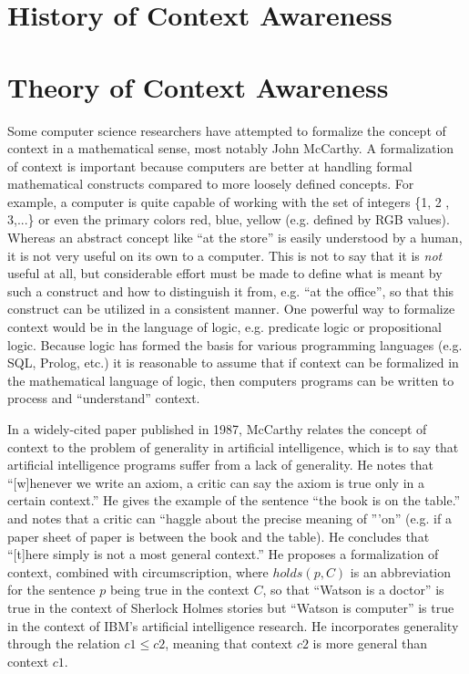 \section{History of Context Awareness}

\section{Theory of Context Awareness}

Some computer science researchers have attempted to formalize the concept of context in a mathematical sense, most notably John McCarthy. A formalization of context is important because computers are better at handling formal mathematical constructs compared to more loosely defined concepts. For example, a computer is quite capable of working with the set of integers \{1, 2 , 3,...\} or even the primary colors {red, blue, yellow} (e.g. defined by RGB values). Whereas an abstract concept like ``at the store'' is easily understood by a human, it is not very useful on its own to a computer. This is not to say that it is \emph{not} useful at all, but considerable effort must be made to define what is meant by such a construct and how to distinguish it from, e.g. ``at the office'', so that this construct can be utilized in a consistent manner. One powerful way to formalize context would be in the language of logic, e.g. predicate logic or propositional logic. Because logic has formed the basis for various programming languages (e.g. SQL, Prolog, etc.) it is reasonable to assume that if context can be formalized in the mathematical language of logic, then computers programs can be written to process and ``understand'' context.

In a widely-cited paper published in 1987, McCarthy relates the concept of context to the problem of generality in artificial intelligence, which is to say that artificial intelligence programs suffer from a lack of generality. He notes that ``[w]henever we write an axiom, a critic can say the axiom is true only in a certain context.'' He gives the example of the sentence ``the book is on the table.'' and notes that a critic can ``haggle about the precise meaning of '''on'' (e.g. if a paper sheet of paper is between the book and the table). He concludes that ``[t]here simply is not a most general context.'' He proposes a formalization of context, combined with circumscription, where $holds(p, C)$ is an abbreviation for the sentence $p$ being true in the context $C$, so that ``Watson is a doctor'' is true in the context of Sherlock Holmes stories but ``Watson is computer'' is true in the context of IBM's artificial intelligence research. He incorporates generality through the relation $c1 \le c2$, meaning that context $c2$ is more general than context $c1$.

